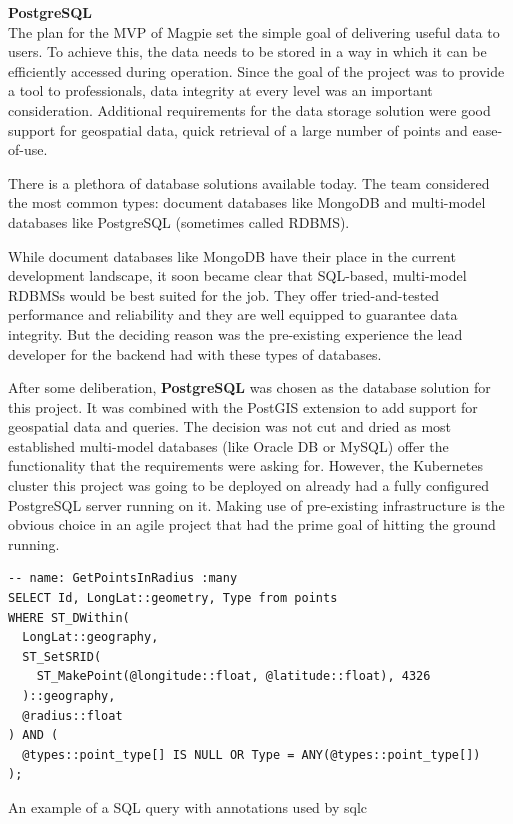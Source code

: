 \textbf{PostgreSQL}\\
The plan for the MVP of Magpie set the simple goal of delivering useful data to
users. To achieve this, the data needs to be stored in a way in which it can be
efficiently accessed during operation. Since the goal of the project was to
provide a tool to professionals, data integrity at every level was an important
consideration. Additional requirements for the data storage solution were good
support for geospatial data, quick retrieval of a large number of points and
ease-of-use.

There is a plethora of database solutions available today. The team considered
the most common types: document databases like MongoDB and multi-model databases
like PostgreSQL (sometimes called RDBMS).

While document databases like MongoDB have their place in the current
development landscape, it soon became clear that SQL-based, multi-model RDBMSs
would be best suited for the job. They offer tried-and-tested performance and
reliability and they are well equipped to guarantee data integrity. But the
deciding reason was the pre-existing experience the lead developer for the
backend had with these types of databases.

After some deliberation, \textbf{PostgreSQL} was chosen as the database solution
for this project. It was combined with the PostGIS extension to add support for
geospatial data and queries. The decision was not cut and dried as most
established multi-model databases (like Oracle DB or MySQL) offer the
functionality that the requirements were asking for. However, the Kubernetes
cluster this project was going to be deployed on already had a fully configured
PostgreSQL server running on it. Making use of pre-existing infrastructure is
the obvious choice in an agile project that had the prime goal of hitting the
ground running.

\begin{listing}[htbp]
  \centering{}
  \begin{minipage}{0.85\textwidth}
  \begin{verbatim}
-- name: GetPointsInRadius :many
SELECT Id, LongLat::geometry, Type from points
WHERE ST_DWithin(
  LongLat::geography,
  ST_SetSRID(
    ST_MakePoint(@longitude::float, @latitude::float), 4326
  )::geography,
  @radius::float
) AND (
  @types::point_type[] IS NULL OR Type = ANY(@types::point_type[])
);
  \end{verbatim}
  \end{minipage}
  \caption{An example of a SQL query with annotations used by sqlc}
  \label{listing:sqlc_query_input}
\end{listing}

